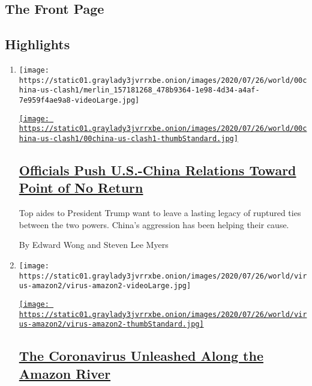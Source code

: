\hypertarget{the-front-page}{%
\subsection{The Front Page}\label{the-front-page}}

\hypertarget{highlights}{%
\subsection{Highlights}\label{highlights}}

\begin{enumerate}
\def\labelenumi{\arabic{enumi}.}
\item
  \texttt{[image: https://static01.graylady3jvrrxbe.onion/images/2020/07/26/world/00china-us-clash1/merlin\_157181268\_478b9364-1e98-4d34-a4af-7e959f4ae9a8-videoLarge.jpg]}

  \href{/2020/07/25/world/asia/us-china-trump-xi.html}{\texttt{[image: https://static01.graylady3jvrrxbe.onion/images/2020/07/26/world/00china-us-clash1/00china-us-clash1-thumbStandard.jpg]}}

  \hypertarget{officials-push-us-china-relations-toward-point-of-no-return}{%
  \subsection{\texorpdfstring{\href{/2020/07/25/world/asia/us-china-trump-xi.html}{Officials
  Push U.S.-China Relations Toward Point of No
  Return}}{Officials Push U.S.-China Relations Toward Point of No Return}}\label{officials-push-us-china-relations-toward-point-of-no-return}}

  Top aides to President Trump want to leave a lasting legacy of
  ruptured ties between the two powers. China's aggression has been
  helping their cause.

  By Edward Wong and Steven Lee Myers
\item
  \texttt{[image: https://static01.graylady3jvrrxbe.onion/images/2020/07/26/world/virus-amazon2/virus-amazon2-videoLarge.jpg]}

  \href{/interactive/2020/07/25/world/americas/coronavirus-brazil-amazon.html}{\texttt{[image: https://static01.graylady3jvrrxbe.onion/images/2020/07/26/world/virus-amazon2/virus-amazon2-thumbStandard.jpg]}}

  \hypertarget{the-coronavirus-unleashed-along-the-amazon-river}{%
  \subsection{\texorpdfstring{\href{/interactive/2020/07/25/world/americas/coronavirus-brazil-amazon.html}{The
  Coronavirus Unleashed Along the Amazon
  River}}{The Coronavirus Unleashed Along the Amazon River}}\label{the-coronavirus-unleashed-along-the-amazon-river}}


\end{enumerate}
